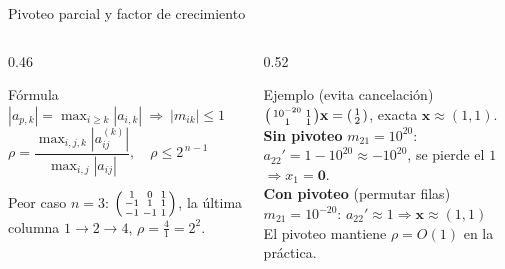 \documentclass[aspectratio=169,10pt]{beamer}
\begin{document}
\begin{frame}{Pivoteo parcial y factor de crecimiento}
\begin{columns}[T]
\begin{column}{0.46\textwidth}
\begin{cardidea}{Fórmula}{\faSuperscript}
{\footnotesize $|a_{p,k}|=\displaystyle\max_{i\ge k}|a_{i,k}|\ \Rightarrow\ |m_{ik}|\le 1$\\[1.4mm]
$\rho=\dfrac{\max_{i,j,k}|a_{ij}^{(k)}|}{\max_{i,j}|a_{ij}|},\quad \rho\le 2^{\,n-1}$}
\end{cardidea}
\vspace{1mm}
\begin{cardnota}[\faInfoCircle]{\footnotesize Peor caso $n{=}3$: $\begin{psmallmatrix}1&0&1\\-1&1&1\\-1&-1&1\end{psmallmatrix}$, la última columna $1{\to}2{\to}4$, $\rho=\tfrac{4}{1}=2^{2}$.}\end{cardnota}
\end{column}
\begin{column}{0.52\textwidth}
\begin{cardgear}{Ejemplo (evita cancelación)}{\faCalculator}
{\footnotesize $\begin{psmallmatrix}10^{-20}&1\\1&1\end{psmallmatrix}\mathbf x=\begin{psmallmatrix}1\\2\end{psmallmatrix}$,\; exacta $\mathbf x\approx(1,1)$.\\[1.4mm]
\textbf{Sin pivoteo} $m_{21}=10^{20}$: $a_{22}'=1-10^{20}\approx-10^{20}$, se pierde el $1$ $\Rightarrow x_1=\mathbf 0$.\\[1.4mm]
\textbf{Con pivoteo} (permutar filas) $m_{21}=10^{-20}$: $a_{22}'\approx1\Rightarrow\mathbf x\approx(1,1)$ \checkmark\\[1.2mm]
El pivoteo mantiene $\rho=O(1)$ en la práctica.}
\end{cardgear}
\end{column}
\end{columns}
\end{frame}
\end{document}
